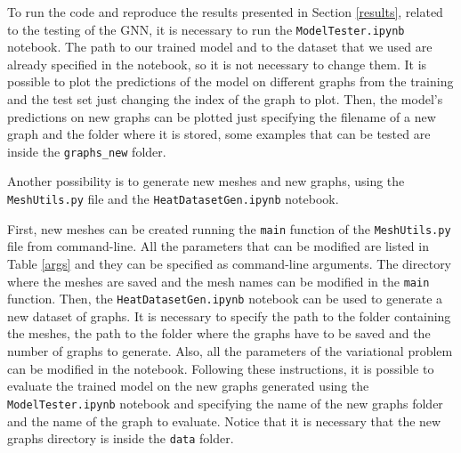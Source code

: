 \documentclass[11pt,a4paper]{article}
\begin{document}
To run the code and reproduce the results presented in Section \ref{results}, related to the testing of the GNN, it is necessary to run the \texttt{ModelTester.ipynb} notebook. The path to our trained model and to the dataset that we used are already specified in the notebook, so it is not necessary to change them. It is possible to plot the predictions of the model on different graphs from the training and the test set just changing the index of the graph to plot. Then, the model's predictions on new graphs can be plotted just specifying the filename of a new graph and the folder where it is stored, some examples that can be tested are inside the \texttt{graphs\_new} folder.

Another possibility is to generate new meshes and new graphs, using the \texttt{MeshUtils.py} file and the \texttt{HeatDatasetGen.ipynb} notebook. 

First, new meshes can be created running the \texttt{main} function of the \texttt{MeshUtils.py} file from command-line. All the parameters that can be modified are listed in Table \ref{args} and they can be specified as command-line arguments. The directory where the meshes are saved and the mesh names can be modified in the \texttt{main} function. 
Then, the \texttt{HeatDatasetGen.ipynb} notebook can be used to generate a new dataset of graphs. It is necessary to specify the path to the folder containing the meshes, the path to the folder where the graphs have to be saved and the number of graphs to generate. Also, all the parameters of the variational problem can be modified in the notebook. 
Following these instructions, it is possible to evaluate the trained model on the new graphs generated using the \texttt{ModelTester.ipynb} notebook and specifying the name of the new graphs folder and the name of the graph to evaluate. Notice that it is necessary that the new graphs directory is inside the \texttt{data} folder.


\end{document}
